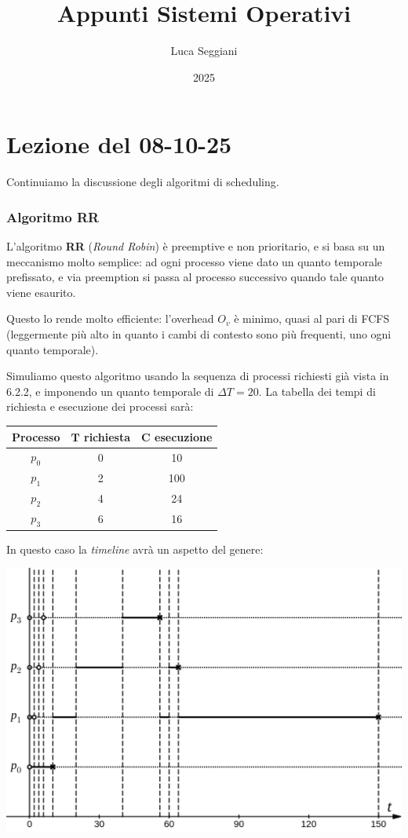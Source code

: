 \documentclass[a4paper,11pt]{article}
\title{Appunti Sistemi Operativi}
\author{Luca Seggiani}
\date{2025}
\begin{document}
\section{Lezione del 08-10-25}

\thispagestyle{empty}
\pagestyle{fancy}

Continuiamo la discussione degli algoritmi di scheduling.

\subsubsection{Algoritmo RR}
L'algoritmo \textbf{RR} (\textit{Round Robin}) è preemptive e non prioritario, e si basa su un meccanismo molto semplice: ad ogni processo viene dato un quanto temporale prefissato, e via preemption si passa al processo successivo quando tale quanto viene esaurito.

Questo lo rende molto efficiente: l'overhead $O_v$ è minimo, quasi al pari di FCFS (leggermente più alto in quanto i cambi di contesto sono più frequenti, uno ogni quanto temporale). 
\par\smallskip

Simuliamo questo algoritmo usando la sequenza di processi richiesti già vista in 6.2.2, e imponendo un quanto temporale di $\Delta T = 20$. La tabella dei tempi di richiesta e esecuzione dei processi sarà:
\begin{table}[H]
	\center {}
	\begin{tabular} { c || c | c }
		\bfseries Processo & \bfseries $\mathbf{T}$ richiesta & \bfseries $\mathbf{C}$ esecuzione \\
		\hline
		$p_0$ & 0 & 10 \\ 
		$p_1$ & 2 & 100 \\ 
		$p_2$ & 4 & 24 \\ 
		$p_3$ & 6 & 16 
	\end{tabular}
\end{table}

\newpage

In questo caso la \textit{timeline} avrà un aspetto del genere:
\begin{center}
	\includegraphics[scale=0.3]{../figures/rr.png}
\end{center}
\end{document}
